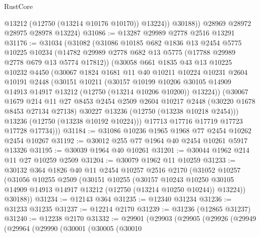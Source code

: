 \begin{lexlean}{RustCore}
\begin{coremodule}
              @13212
              (@12750 (@13214 @10176 @10170))
              @13224))
          @30188))
      @28969
      @28972
      @28975
      @28978
      @13224)
@31086 := @13287 @29989 @2778 @2516 @13291
@31176 := @31034
    (@31082
      (@31086
        @10185
        @682
        @1836
        @13
        @2454
        @5775
        @10225
        @10234
        (@14782 @29989 @2778 @682 @13 @5775 (@17788 @29989 @2778 @679 @13 @5774 @17812))
        (@30058
          @661
          @1835
          @43
          @13
          @10225
          @10232
          @4450
          (@30067
            @1824
            @1681
            @11
            @40
            @10211
            @10224
            @10231
            @2604
            @10191
            @2448
            (@30151
              @10211
              (@30157
                @10199
                @10206
                @30105
                @14909
                @14913
                @14917
                @13212
                (@12750 (@13214 @10206 @10200))
                @13224))
            (@30067
              @1679
              @214
              @11
              @27
              @8453
              @2454
              @2509
              @2604
              @10217
              @2448
              (@30220 @1678 @8453 @27134 @27138)
              @30227
              @13236
              (@12750 (@13238 @10218 @2454)))
            @13236
            (@12750 (@13238 @10192 @10224)))
          @17713
          @17716
          @17719
          @17723
          @17728
          @17734)))
@31184 := @31086 @10236 @1965 @1968 @77 @2454 @10262 @2454 @10267
@31192 := @30012 @255 @77 @1964 @40 @2454 @10261 @5917 @13326
@31195 := @30039 @1964 @40 @10261
@31201 := @30044 @1962 @214 @11 @27 @10259 @2509
@31204 := @30079 @1962 @11 @10259
@31233 := @30132
    @364
    @1826
    @40
    @11
    @2454
    @10257
    @2516
    @2170
    (@31052
      @10257
      (@31056
        @10255
        @2509
        (@30151
          @10255
          (@30157
            @10243
            @10250
            @30105
            @14909
            @14913
            @14917
            @13212
            (@12750 (@13214 @10250 @10244))
            @13224))
        @30188))
@31234 := @12143 @364
@31235 := @12340 @31234
@31236 := @31233 @31235
@31237 := @12214 @2170
@31239 := @31236 (@12865 @31237)
@31240 := @12238 @2170
@31332 := @29901
    (@29903
      (@29905
        (@29926
          (@29949
            (@29964
              (@29990
                (@30001
                  (@30005
                    (@30010

\end{coremodule}
\end{lexlean}
